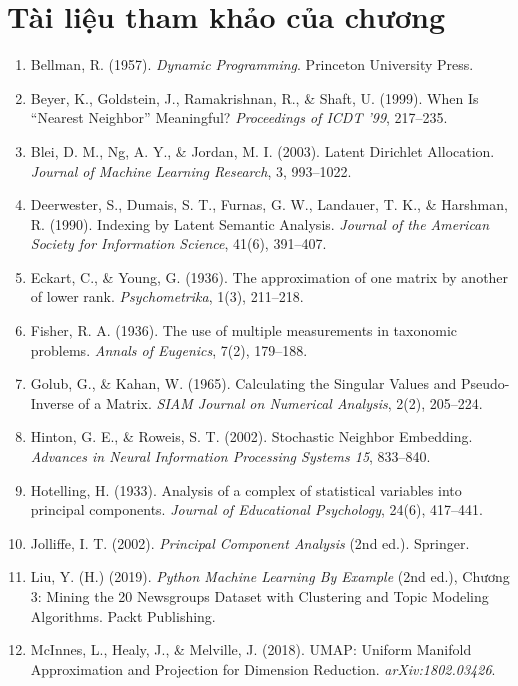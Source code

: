 \section*{Tài liệu tham khảo của chương}
\begin{enumerate}
    \item Bellman, R. (1957). \textit{Dynamic Programming}. Princeton University Press.
    \item Beyer, K., Goldstein, J., Ramakrishnan, R., \& Shaft, U. (1999). When Is ``Nearest Neighbor'' Meaningful? \textit{Proceedings of ICDT '99}, 217--235.
    \item Blei, D. M., Ng, A. Y., \& Jordan, M. I. (2003). Latent Dirichlet Allocation. \textit{Journal of Machine Learning Research}, 3, 993--1022.
    \item Deerwester, S., Dumais, S. T., Furnas, G. W., Landauer, T. K., \& Harshman, R. (1990). Indexing by Latent Semantic Analysis. \textit{Journal of the American Society for Information Science}, 41(6), 391--407.
    \item Eckart, C., \& Young, G. (1936). The approximation of one matrix by another of lower rank. \textit{Psychometrika}, 1(3), 211--218.
    \item Fisher, R. A. (1936). The use of multiple measurements in taxonomic problems. \textit{Annals of Eugenics}, 7(2), 179--188.
    \item Golub, G., \& Kahan, W. (1965). Calculating the Singular Values and Pseudo-Inverse of a Matrix. \textit{SIAM Journal on Numerical Analysis}, 2(2), 205--224.
    \item Hinton, G. E., \& Roweis, S. T. (2002). Stochastic Neighbor Embedding. \textit{Advances in Neural Information Processing Systems 15}, 833--840.
    \item Hotelling, H. (1933). Analysis of a complex of statistical variables into principal components. \textit{Journal of Educational Psychology}, 24(6), 417--441.
    \item Jolliffe, I. T. (2002). \textit{Principal Component Analysis} (2nd ed.). Springer.
    \item Liu, Y. (H.) (2019). \textit{Python Machine Learning By Example} (2nd ed.), Chương 3: Mining the 20 Newsgroups Dataset with Clustering and Topic Modeling Algorithms. Packt Publishing.
    \item McInnes, L., Healy, J., \& Melville, J. (2018). UMAP: Uniform Manifold Approximation and Projection for Dimension Reduction. \textit{arXiv:1802.03426}.

\end{enumerate}
